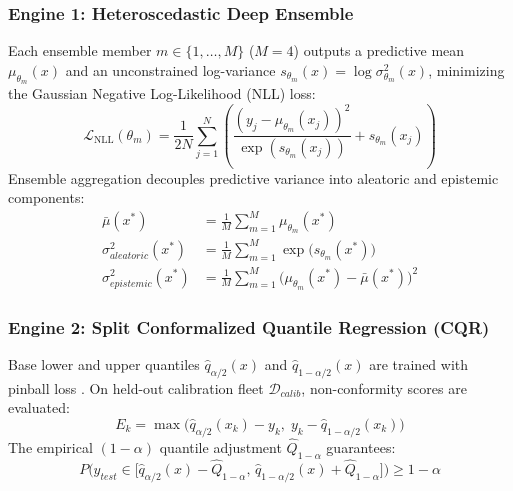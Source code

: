 \documentclass[journal,10pt,twocolumn]{article}
\begin{document}
\subsubsection{Engine 1: Heteroscedastic Deep Ensemble}
Each ensemble member $m \in \{1, \dots, M\}$ ($M = 4$) outputs a predictive mean $\mu_{\theta_m}(x)$ and an unconstrained log-variance $s_{\theta_m}(x) = \log \sigma_{\theta_m}^2(x)$, minimizing the Gaussian Negative Log-Likelihood (NLL) loss:
\begin{equation}
\mathcal{L}_{\text{NLL}}(\theta_m) = \frac{1}{2N} \sum_{j=1}^N \left( \frac{(y_j - \mu_{\theta_m}(x_j))^2}{\exp(s_{\theta_m}(x_j))} + s_{\theta_m}(x_j) \right)
\end{equation}
Ensemble aggregation decouples predictive variance into aleatoric and epistemic components:
\begin{align}
\bar{\mu}(x^*) &= \frac{1}{M} \sum_{m=1}^M \mu_{\theta_m}(x^*) \\
\sigma_{aleatoric}^2(x^*) &= \frac{1}{M} \sum_{m=1}^M \exp\big(s_{\theta_m}(x^*)\big) \\
\sigma_{epistemic}^2(x^*) &= \frac{1}{M} \sum_{m=1}^M \big(\mu_{\theta_m}(x^*) - \bar{\mu}(x^*)\big)^2
\end{align}

\subsubsection{Engine 2: Split Conformalized Quantile Regression (CQR)}
Base lower and upper quantiles $\hat{q}_{\alpha/2}(x)$ and $\hat{q}_{1-\alpha/2}(x)$ are trained with pinball loss \cite{romano2019malice}. On held-out calibration fleet $\mathcal{D}_{calib}$, non-conformity scores are evaluated:
\begin{equation}
E_k = \max\Big( \hat{q}_{\alpha/2}(x_k) - y_k, \; y_k - \hat{q}_{1-\alpha/2}(x_k) \Big)
\end{equation}
The empirical $(1-\alpha)$ quantile adjustment $\hat{Q}_{1-\alpha}$ guarantees:
\begin{equation}
P\Big( y_{test} \in \big[ \hat{q}_{\alpha/2}(x) - \hat{Q}_{1-\alpha}, \, \hat{q}_{1-\alpha/2}(x) + \hat{Q}_{1-\alpha} \big] \Big) \ge 1 - \alpha
\end{equation}
\end{document}
